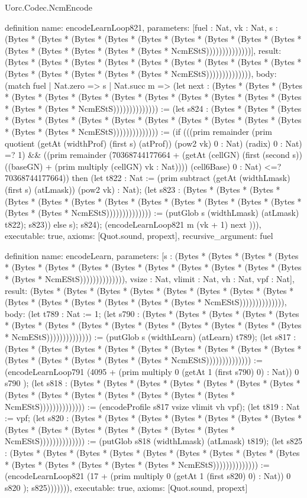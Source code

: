 \begin{lexlean}{Uorc.Codec.NcmEncode}
\begin{semanticmodule}
definition{
  name: encodeLearnLoop821,
  parameters: [fuel : Nat, vk : Nat, s : (Bytes * (Bytes * (Bytes * (Bytes * (Bytes * (Bytes * (Bytes * (Bytes * (Bytes * (Bytes * (Bytes * (Bytes * (Bytes * (Bytes * NcmEStS))))))))))))))],
  result: (Bytes * (Bytes * (Bytes * (Bytes * (Bytes * (Bytes * (Bytes * (Bytes * (Bytes * (Bytes * (Bytes * (Bytes * (Bytes * (Bytes * NcmEStS)))))))))))))),
  body: (match fuel
    | Nat.zero => s
    | Nat.succ m => (let next : (Bytes * (Bytes * (Bytes * (Bytes * (Bytes * (Bytes * (Bytes * (Bytes * (Bytes * (Bytes * (Bytes * (Bytes * (Bytes * (Bytes * NcmEStS)))))))))))))) := (let s824 : (Bytes * (Bytes * (Bytes * (Bytes * (Bytes * (Bytes * (Bytes * (Bytes * (Bytes * (Bytes * (Bytes * (Bytes * (Bytes * (Bytes * NcmEStS)))))))))))))) := (if (((prim remainder (prim quotient (getAt (widthProf) (first s) (atProf)) (pow2 vk) 0 : Nat) (radix) 0 : Nat) =? 1) && ((prim remainder (70368744177664 + (getAt (cellGN) (first (second s)) ((baseGN) + (prim multiply (cellGN) vk : Nat)))) (cell6Base) 0 : Nat) <=? 70368744177664)) then (let t822 : Nat := (prim subtract (getAt (widthLmask) (first s) (atLmask)) (pow2 vk) : Nat); (let s823 : (Bytes * (Bytes * (Bytes * (Bytes * (Bytes * (Bytes * (Bytes * (Bytes * (Bytes * (Bytes * (Bytes * (Bytes * (Bytes * (Bytes * NcmEStS)))))))))))))) := (putGlob s (widthLmask) (atLmask) t822); s823)) else s); s824); (encodeLearnLoop821 m (vk + 1) next ))),
  executable: true,
  axioms: [Quot.sound, propext],
  recursive_argument: fuel
}

definition{
  name: encodeLearn,
  parameters: [s : (Bytes * (Bytes * (Bytes * (Bytes * (Bytes * (Bytes * (Bytes * (Bytes * (Bytes * (Bytes * (Bytes * (Bytes * (Bytes * (Bytes * NcmEStS)))))))))))))), vsize : Nat, vlimit : Nat, vh : Nat, vpf : Nat],
  result: (Bytes * (Bytes * (Bytes * (Bytes * (Bytes * (Bytes * (Bytes * (Bytes * (Bytes * (Bytes * (Bytes * (Bytes * (Bytes * (Bytes * NcmEStS)))))))))))))),
  body: (let t789 : Nat := 1; (let s790 : (Bytes * (Bytes * (Bytes * (Bytes * (Bytes * (Bytes * (Bytes * (Bytes * (Bytes * (Bytes * (Bytes * (Bytes * (Bytes * (Bytes * NcmEStS)))))))))))))) := (putGlob s (widthLearn) (atLearn) t789); (let s817 : (Bytes * (Bytes * (Bytes * (Bytes * (Bytes * (Bytes * (Bytes * (Bytes * (Bytes * (Bytes * (Bytes * (Bytes * (Bytes * (Bytes * NcmEStS)))))))))))))) := (encodeLearnLoop791 (4095 + (prim multiply 0 (getAt 1 (first s790) 0) : Nat)) 0 s790 ); (let s818 : (Bytes * (Bytes * (Bytes * (Bytes * (Bytes * (Bytes * (Bytes * (Bytes * (Bytes * (Bytes * (Bytes * (Bytes * (Bytes * (Bytes * NcmEStS)))))))))))))) := (encodeProfile s817 vsize vlimit vh vpf); (let t819 : Nat := vpf; (let s820 : (Bytes * (Bytes * (Bytes * (Bytes * (Bytes * (Bytes * (Bytes * (Bytes * (Bytes * (Bytes * (Bytes * (Bytes * (Bytes * (Bytes * NcmEStS)))))))))))))) := (putGlob s818 (widthLmask) (atLmask) t819); (let s825 : (Bytes * (Bytes * (Bytes * (Bytes * (Bytes * (Bytes * (Bytes * (Bytes * (Bytes * (Bytes * (Bytes * (Bytes * (Bytes * (Bytes * NcmEStS)))))))))))))) := (encodeLearnLoop821 (17 + (prim multiply 0 (getAt 1 (first s820) 0) : Nat)) 0 s820 ); s825))))))),
  executable: true,
  axioms: [Quot.sound, propext]
}


\end{semanticmodule}
\end{lexlean}
